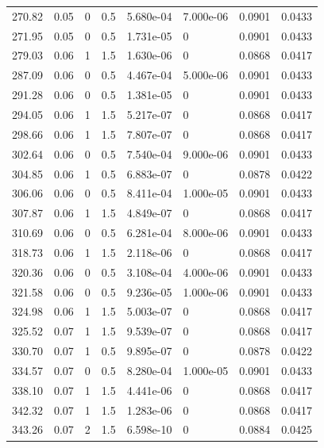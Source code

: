 \documentclass[preview]{standalone}
\begin{document}
{{{\begin{tabular}{L{1.2cm}C{1.2cm} C{0.3cm}C{0.5cm} C{1.4cm}C{1.4cm} C{1.4cm}C{1.4cm}}
  270.82  &  0.05  & 0     & 0.5 &  5.680e-04  & 7.000e-06  & 0.0901 &  0.0433   \\ 
  271.95  &  0.05  & 0     & 0.5 &  1.731e-05  & 0  & 0.0901 &  0.0433   \\ 
  279.03  &  0.06  & 1     & 1.5 &  1.630e-06  & 0  & 0.0868 &  0.0417   \\ 
  287.09  &  0.06  & 0     & 0.5 &  4.467e-04  & 5.000e-06  & 0.0901 &  0.0433   \\ 
  291.28  &  0.06  & 0     & 0.5 &  1.381e-05  & 0  & 0.0901 &  0.0433   \\ 
  294.05  &  0.06  & 1     & 1.5 &  5.217e-07  & 0  & 0.0868 &  0.0417   \\ 
  298.66  &  0.06  & 1     & 1.5 &  7.807e-07  & 0  & 0.0868 &  0.0417   \\ 
  302.64  &  0.06  & 0     & 0.5 &  7.540e-04  & 9.000e-06  & 0.0901 &  0.0433   \\ 
  304.85  &  0.06  & 1     & 0.5 &  6.883e-07  & 0  & 0.0878 &  0.0422   \\ 
  306.06  &  0.06  & 0     & 0.5 &  8.411e-04  & 1.000e-05  & 0.0901 &  0.0433   \\ 
  307.87  &  0.06  & 1     & 1.5 &  4.849e-07  & 0  & 0.0868 &  0.0417   \\ 
  310.69  &  0.06  & 0     & 0.5 &  6.281e-04  & 8.000e-06  & 0.0901 &  0.0433   \\ 
  318.73  &  0.06  & 1     & 1.5 &  2.118e-06  & 0  & 0.0868 &  0.0417   \\ 
  320.36  &  0.06  & 0     & 0.5 &  3.108e-04  & 4.000e-06  & 0.0901 &  0.0433   \\ 
  321.58  &  0.06  & 0     & 0.5 &  9.236e-05  & 1.000e-06  & 0.0901 &  0.0433   \\ 
  324.98  &  0.06  & 1     & 1.5 &  5.003e-07  & 0  & 0.0868 &  0.0417   \\ 
  325.52  &  0.07  & 1     & 1.5 &  9.539e-07  & 0  & 0.0868 &  0.0417   \\ 
  330.70  &  0.07  & 1     & 0.5 &  9.895e-07  & 0  & 0.0878 &  0.0422   \\ 
  334.57  &  0.07  & 0     & 0.5 &  8.280e-04  & 1.000e-05  & 0.0901 &  0.0433   \\ 
  338.10  &  0.07  & 1     & 1.5 &  4.441e-06  & 0  & 0.0868 &  0.0417   \\ 
  342.32  &  0.07  & 1     & 1.5 &  1.283e-06  & 0  & 0.0868 &  0.0417   \\ 
  343.26  &  0.07  & 2     & 1.5 &  6.598e-10  & 0  & 0.0884 &  0.0425   \\ 

\end{tabular}}}}
\end{document}
